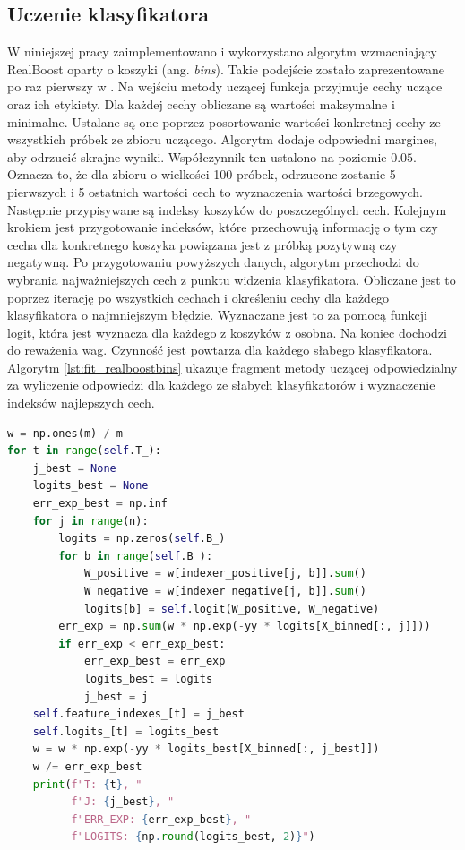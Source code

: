 \subsection{Uczenie klasyfikatora}
W niniejszej pracy zaimplementowano i wykorzystano algorytm wzmacniający RealBoost oparty o koszyki (ang. \textit{bins}).
Takie podejście zostało zaprezentowane po raz pierwszy w \cite{1689652}.
Na wejściu metody uczącej funkcja przyjmuje cechy uczące oraz ich etykiety.
Dla każdej cechy obliczane są wartości maksymalne i minimalne.
Ustalane są one poprzez posortowanie wartości konkretnej cechy ze wszystkich próbek ze zbioru uczącego.
Algorytm dodaje odpowiedni margines, aby odrzucić skrajne wyniki.
Współczynnik ten ustalono na poziomie $0.05$.
Oznacza to, że dla zbioru o wielkości 100 próbek, odrzucone zostanie 5 pierwszych i 5 ostatnich wartości cech to wyznaczenia wartości brzegowych.
Następnie przypisywane są indeksy koszyków do poszczególnych cech.
Kolejnym krokiem jest przygotowanie indeksów, które przechowują informację o tym czy cecha dla konkretnego koszyka powiązana jest z próbką pozytywną czy negatywną.
Po przygotowaniu powyższych danych, algorytm przechodzi do wybrania najważniejszych cech z punktu widzenia klasyfikatora.
Obliczane jest to poprzez iterację po wszystkich cechach i określeniu cechy dla każdego klasyfikatora o najmniejszym błędzie.
Wyznaczane jest to za pomocą funkcji logit, która jest wyznacza dla każdego z koszyków z osobna.
Na koniec dochodzi do reważenia wag.
Czynność jest powtarza dla każdego słabego klasyfikatora.
Algorytm \ref{lst:fit_realboostbins} ukazuje fragment metody uczącej odpowiedzialny za wyliczenie odpowiedzi dla każdego ze słabych klasyfikatorów i wyznaczenie indeksów najlepszych cech.
\begin{lstlisting}[language=Python, caption=Procedura ucząca klasyfikator RealBoostBins, label={lst:fit_realboostbins}]
w = np.ones(m) / m
for t in range(self.T_):
    j_best = None
    logits_best = None
    err_exp_best = np.inf
    for j in range(n):
        logits = np.zeros(self.B_)
        for b in range(self.B_):
            W_positive = w[indexer_positive[j, b]].sum()
            W_negative = w[indexer_negative[j, b]].sum()
            logits[b] = self.logit(W_positive, W_negative)
        err_exp = np.sum(w * np.exp(-yy * logits[X_binned[:, j]]))
        if err_exp < err_exp_best:
            err_exp_best = err_exp
            logits_best = logits
            j_best = j
    self.feature_indexes_[t] = j_best
    self.logits_[t] = logits_best
    w = w * np.exp(-yy * logits_best[X_binned[:, j_best]])
    w /= err_exp_best
    print(f"T: {t}, "
          f"J: {j_best}, "
          f"ERR_EXP: {err_exp_best}, "
          f"LOGITS: {np.round(logits_best, 2)}")
\end{lstlisting}
